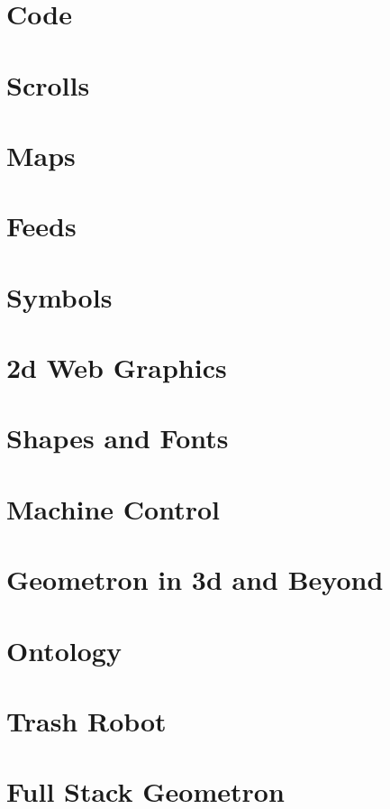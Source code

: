 \documentclass[ebook,12pt,openany,onesided]{memoir} %
\begin{document}
\chapter{Code}

\chapter{Scrolls}

\chapter{Maps}

\chapter{Feeds}

\chapter{Symbols}

\chapter{2d Web Graphics}

\chapter{Shapes and Fonts}

\chapter{Machine Control}

\chapter{Geometron in 3d and Beyond}

\chapter{Ontology}

\chapter{Trash Robot}

\chapter{Full Stack Geometron}



\end{document}

